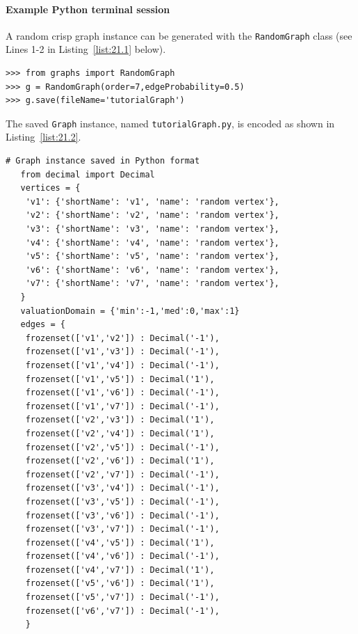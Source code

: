 \paragraph{\textbf{Example Python terminal session}}

\noindent A random crisp graph instance can be generated with the \texttt{RandomGraph} class (see Lines 1-2 in Listing~\vref{list:21.1} below). 
\begin{lstlisting}[caption={Generating a randm graph instance},label=list:21.1]
>>> from graphs import RandomGraph
>>> g = RandomGraph(order=7,edgeProbability=0.5)
>>> g.save(fileName='tutorialGraph')
\end{lstlisting}

The saved \texttt{Graph} instance, named \texttt{tutorialGraph.py}, is encoded as shown in Listing~\vref{list:21.2}.
\begin{lstlisting}[caption={Stored instance of the random graph},label=list:21.2]
  # Graph instance saved in Python format
   from decimal import Decimal
   vertices = {
    'v1': {'shortName': 'v1', 'name': 'random vertex'},
    'v2': {'shortName': 'v2', 'name': 'random vertex'},
    'v3': {'shortName': 'v3', 'name': 'random vertex'},
    'v4': {'shortName': 'v4', 'name': 'random vertex'},
    'v5': {'shortName': 'v5', 'name': 'random vertex'},
    'v6': {'shortName': 'v6', 'name': 'random vertex'},
    'v7': {'shortName': 'v7', 'name': 'random vertex'},
   }
   valuationDomain = {'min':-1,'med':0,'max':1}
   edges = {
    frozenset(['v1','v2']) : Decimal('-1'), 
    frozenset(['v1','v3']) : Decimal('-1'), 
    frozenset(['v1','v4']) : Decimal('-1'), 
    frozenset(['v1','v5']) : Decimal('1'), 
    frozenset(['v1','v6']) : Decimal('-1'), 
    frozenset(['v1','v7']) : Decimal('-1'), 
    frozenset(['v2','v3']) : Decimal('1'), 
    frozenset(['v2','v4']) : Decimal('1'), 
    frozenset(['v2','v5']) : Decimal('-1'), 
    frozenset(['v2','v6']) : Decimal('1'), 
    frozenset(['v2','v7']) : Decimal('-1'), 
    frozenset(['v3','v4']) : Decimal('-1'), 
    frozenset(['v3','v5']) : Decimal('-1'), 
    frozenset(['v3','v6']) : Decimal('-1'), 
    frozenset(['v3','v7']) : Decimal('-1'), 
    frozenset(['v4','v5']) : Decimal('1'), 
    frozenset(['v4','v6']) : Decimal('-1'), 
    frozenset(['v4','v7']) : Decimal('1'), 
    frozenset(['v5','v6']) : Decimal('1'), 
    frozenset(['v5','v7']) : Decimal('-1'), 
    frozenset(['v6','v7']) : Decimal('-1'), 
    }
\end{lstlisting}

